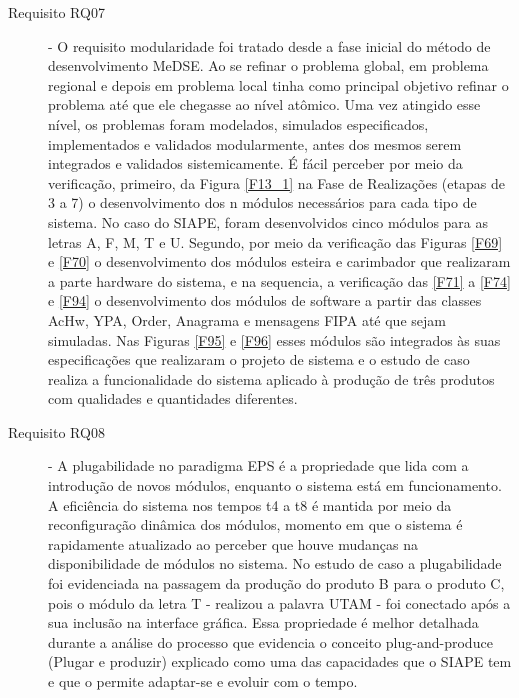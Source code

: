 \documentclass[10pt,letterpaper,twocolumn]{IEEEtran}
\begin{document}
\begin{description}
	\item[Requisito RQ07] - O requisito modularidade foi tratado desde a fase inicial do método de desenvolvimento MeDSE. Ao se refinar o problema global, em problema regional e depois em problema local tinha como principal objetivo refinar o problema até que ele chegasse ao nível atômico. Uma vez atingido esse nível, os problemas foram modelados, simulados especificados, implementados e validados modularmente, antes dos mesmos serem integrados e validados sistemicamente. É fácil perceber  por meio da verificação, primeiro, da Figura \ref{F13_1} na Fase de Realizações (etapas de 3 a 7) o desenvolvimento dos n módulos necessários para cada tipo de sistema. No caso do SIAPE, foram desenvolvidos cinco módulos para as letras A, F, M, T e U. Segundo, por meio da verificação das Figuras \ref{F69} e \ref{F70} o desenvolvimento dos módulos esteira e carimbador que realizaram a parte hardware do sistema, e na sequencia, a verificação das \ref{F71} a \ref{F74} e \ref{F94} o desenvolvimento dos módulos de software a partir das classes AcHw, YPA, Order, Anagrama e mensagens FIPA até que sejam simuladas. Nas Figuras \ref{F95} e \ref{F96} esses módulos são integrados às suas especificações que realizaram o projeto de sistema e o estudo de caso realiza a funcionalidade do sistema aplicado à produção de três produtos com qualidades e quantidades diferentes. 
	
	
	\item[Requisito RQ08] - A plugabilidade no paradigma EPS é a propriedade que lida com a introdução de novos módulos, enquanto o sistema está em funcionamento. A eficiência do sistema nos tempos t4 a t8 é mantida por meio da reconfiguração dinâmica dos módulos, momento em que o sistema é rapidamente atualizado ao perceber que houve mudanças na disponibilidade de módulos no sistema. No estudo de caso a plugabilidade foi evidenciada na passagem da produção do produto B para o produto C, pois o módulo da letra T - realizou a palavra UTAM - foi conectado após a sua inclusão na interface gráfica. Essa propriedade é melhor detalhada durante a análise do processo que evidencia o conceito plug-and-produce (Plugar e produzir) explicado como uma das capacidades que  o SIAPE tem e que o permite adaptar-se e evoluir com o tempo.
	

\end{description}
\end{document}
